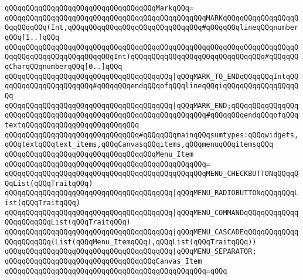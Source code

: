 \newline
\verb|qQQqqQQqqQQqqQQqqQQqqQQqqQQqqQQqqQQqMarkqQQq=|\newline
\verb|qQQqqQQqqQQqqQQqqQQqqQQqqQQqqQQqqQQqqQQqqQQqqQQqMARKqQQqqQQqqQQqqQQqqQQqqQQqqQQq(Int,qQQqqQQqqQQqqQQqqQQqqQQqqQQqqQQq#qQQqqQQqlineqQQqnumberqQQq[1..]qQQq|\newline
\verb|qQQqqQQqqQQqqQQqqQQqqQQqqQQqqQQqqQQqqQQqqQQqqQQqqQQqqQQqqQQqqQQqqQQqqQQqqQQqqQQqqQQqqQQqqQQqqQQqInt)qQQqqQQqqQQqqQQqqQQqqQQqqQQqqQQq#qQQqqQQqCharqQQqnumberqQQq[0..]qQQq|\newline
\verb|qQQqqQQqqQQqqQQqqQQqqQQqqQQqqQQqqQQqqQQq|\verb#|qQQqMARK_TO_ENDqQQqqQQqIntqQQqqQQqqQQqqQQqqQQqqQQq#\verb|#qQQqqQQqendqQQqofqQQqlineqQQqiqQQqqQQqqQQqqQQqqQQq|\newline
\verb|qQQqqQQqqQQqqQQqqQQqqQQqqQQqqQQqqQQqqQQq|\verb#|qQQqMARK_END;qQQqqQQqqQQqqQQqqQQqqQQqqQQqqQQqqQQqqQQqqQQqqQQqqQQqqQQqqQQqqQQq#\verb|#qQQqqQQqendqQQqofqQQqtextqQQqqQQqqQQqqQQqqQQqqQQqqQQq|\newline
\newline
\newline
\verb|qQQqqQQqqQQqqQQqqQQqqQQqqQQqqQQq#qQQqqQQqmainqQQqsumtypes:qQQqwidgets,qQQqtextqQQqtext_items,qQQqCanvasqQQqitems,qQQqmenuqQQqitemsqQQq|\newline
\newline
\verb|qQQqqQQqqQQqqQQqqQQqqQQqqQQqqQQqqQQqMenu_Item|\newline
\verb|qQQqqQQqqQQqqQQqqQQqqQQqqQQqqQQqqQQqqQQqqQQqqQQq=|\newline
\verb|qQQqqQQqqQQqqQQqqQQqqQQqqQQqqQQqqQQqqQQqqQQqqQQqMENU_CHECKBUTTONqQQqqQQqList(qQQqTraitqQQq)|\newline
\verb|qQQqqQQqqQQqqQQqqQQqqQQqqQQqqQQqqQQqqQQq|\verb#|qQQqMENU_RADIOBUTTONqQQqqQQqList(qQQqTraitqQQq)#\newline
\verb|qQQqqQQqqQQqqQQqqQQqqQQqqQQqqQQqqQQqqQQq|\verb#|qQQqMENU_COMMANDqQQqqQQqqQQqqQQqqQQqqQQqList(qQQqTraitqQQq)#\newline
\verb|qQQqqQQqqQQqqQQqqQQqqQQqqQQqqQQqqQQqqQQq|\verb#|qQQqMENU_CASCADEqQQqqQQqqQQqqQQqqQQqqQQq(List(qQQqMenu_ItemqQQq),qQQqList(qQQqTraitqQQq))#\newline
\verb|qQQqqQQqqQQqqQQqqQQqqQQqqQQqqQQqqQQqqQQq|\verb#|qQQqMENU_SEPARATOR;#\newline
\newline
\verb|qQQqqQQqqQQqqQQqqQQqqQQqqQQqqQQqqQQqCanvas_Item|\newline
\verb|qQQqqQQqqQQqqQQqqQQqqQQqqQQqqQQqqQQqqQQqqQQqqQQq=qQQq|\newline
